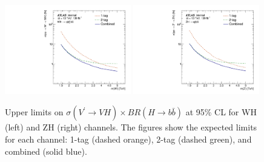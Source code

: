 \begin{figure}[htbp!]
    \begin{center}
        \includegraphics[width=0.49\textwidth]{VHqqbbLimit_WH_channels.pdf}
        \includegraphics[width=0.49\textwidth]{VHqqbbLimit_ZH_channels.pdf}
    \end{center}
    \caption{Upper limits on $\sigma(V^\prime \rightarrow VH) \times BR(H \rightarrow b\bar{b})$ at 95\% CL for WH (left) and ZH (right) channels.
        The figures show the expected limits for each channel: 1-tag (dashed orange), 2-tag (dashed green), and combined (solid blue).
    }
    \label{fig:exp_limit_channels}
\end{figure}


